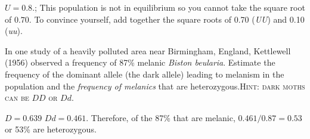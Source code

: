 \documentclass[12pt]{exam}
\newcommand*\AnswerBox[2]{%
    \parbox[t][#1]{0.92\textwidth}{%
    \begin{solution}#2\end{solution}}
}
\begin{document}
\begin{questions}
\AnswerBox{4\baselineskip}{$U = 0.8.$; This population is not in equilibrium so you cannot take the square root of $0.70.$ To convince yourself, add together the square roots of 0.70 (\textit{UU}) and 0.10 (\textit{uu}).}


\question
 In one study of a heavily polluted area near Birmingham, England, Kettlewell (1956) observed a frequency of 87\% melanic \textit{Biston beularia}. Estimate the frequency of the dominant allele (the dark allele) leading to melanism in the population and the \emph{frequency of melanics} that are heterozygous.\textsc{Hint: dark moths can be $DD$ or $Dd$.}

\AnswerBox{2\baselineskip}{$D = 0.639$ \quad $Dd = 0.461$. Therefore, of the 87\% that are melanic, $0.461/0.87 = 0.53$ or 53\% are heterozygous.}

\end{questions}
\end{document}
